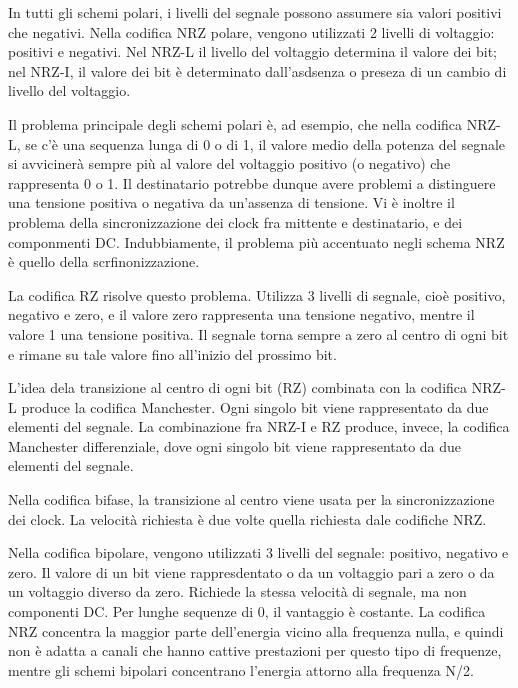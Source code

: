\vspace{3mm}

In tutti gli schemi polari, i livelli del segnale possono assumere sia valori positivi che negativi. Nella codifica NRZ polare, vengono utilizzati 2 livelli di voltaggio: positivi e negativi. Nel NRZ-L il livello del voltaggio determina il valore dei bit; nel NRZ-I, il valore dei bit è determinato dall'asdsenza o preseza di un cambio di livello del voltaggio.

\vspace{3mm}

Il problema principale degli schemi polari è, ad esempio, che nella codifica NRZ-L, se c'è una sequenza lunga di 0 o di 1, il valore medio della potenza del segnale si avvicinerà sempre più al valore del voltaggio positivo (o negativo) che rappresenta 0 o 1. Il destinatario potrebbe dunque avere problemi a distinguere una tensione positiva o negativa da un'assenza di tensione. Vi è inoltre il problema della sincronizzazione dei clock fra mittente e destinatario, e dei componmenti DC. Indubbiamente, il problema più accentuato negli schema NRZ è quello della scrfinonizzazione.

\vspace{3mm}

La codifica RZ risolve questo problema. Utilizza 3 livelli di segnale, cioè positivo, negativo e zero, e il valore zero rappresenta una tensione negativo, mentre il valore 1 una tensione positiva. Il segnale torna sempre a zero al centro di ogni bit e rimane su tale valore fino all'inizio del prossimo bit.

\vspace{3mm}

L'idea dela transizione al centro di ogni bit (RZ) combinata con la codifica NRZ-L produce la codifica Manchester. Ogni singolo bit viene rappresentato da due elementi del segnale. La combinazione fra NRZ-I e RZ produce, invece, la codifica Manchester differenziale, dove ogni singolo bit viene rappresentato da due elementi del segnale.

\vspace{3mm}

Nella codifica bifase, la transizione al centro viene usata per la sincronizzazione dei clock. La velocità richiesta è due volte quella richiesta dale codifiche NRZ.

\vspace{3mm}

Nella codifica bipolare, vengono utilizzati 3 livelli del segnale: positivo, negativo e zero. Il valore di un bit viene rappresdentato o da un voltaggio pari a zero o da un voltaggio diverso da zero. Richiede la stessa velocità di segnale, ma non componenti DC. Per lunghe sequenze di 0, il vantaggio è costante. La codifica NRZ concentra la maggior parte dell'energia vicino alla frequenza nulla, e quindi non è adatta a canali che hanno cattive prestazioni per questo tipo di frequenze, mentre gli schemi bipolari concentrano l'energia attorno alla frequenza N/2.

